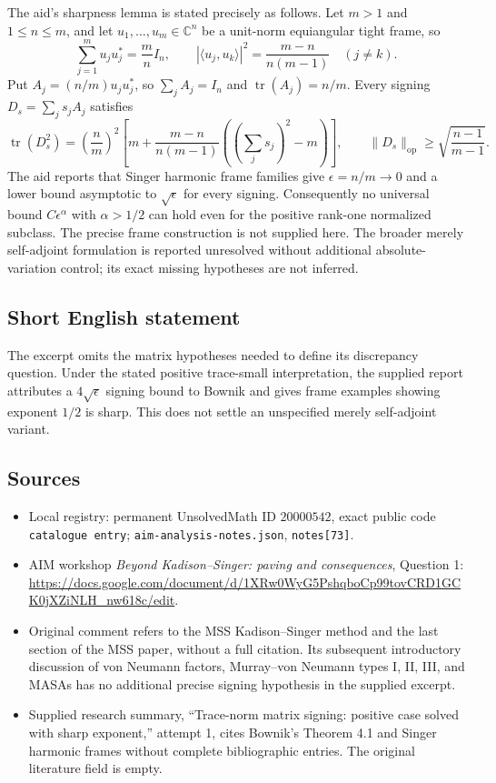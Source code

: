 \documentclass[11pt]{article}
\newcommand{\C}{\mathbb{C}}
\begin{document}
The aid's sharpness lemma is stated precisely as follows. Let \(m>1\) and \(1\leq n\leq m\), and let \(u_1,\ldots,u_m\in\C^n\) be a unit-norm equiangular tight frame, so
\[
 \sum_{j=1}^m u_ju_j^*=\frac mn I_n,\qquad
 |\langle u_j,u_k\rangle|^2=\frac{m-n}{n(m-1)}\quad(j\neq k).
\]
Put \(A_j=(n/m)u_ju_j^*\), so \(\sum_jA_j=I_n\) and \(\operatorname{tr}(A_j)=n/m\). Every signing \(D_s=\sum_js_jA_j\) satisfies
\[
 \operatorname{tr}(D_s^2)=\left(\frac nm\right)^2
 \left[m+\frac{m-n}{n(m-1)}\left(\left(\sum_js_j\right)^2-m\right)\right],\qquad
 \|D_s\|_{\mathrm{op}}\geq\sqrt{\frac{n-1}{m-1}}.
\]
The aid reports that Singer harmonic frame families give \(\epsilon=n/m\to0\) and a lower bound asymptotic to \(\sqrt\epsilon\) for every signing. Consequently no universal bound \(C\epsilon^\alpha\) with \(\alpha>1/2\) can hold even for the positive rank-one normalized subclass. The precise frame construction is not supplied here. The broader merely self-adjoint formulation is reported unresolved without additional absolute-variation control; its exact missing hypotheses are not inferred.
\subsection{Short English statement}
The excerpt omits the matrix hypotheses needed to define its discrepancy question. Under the stated positive trace-small interpretation, the supplied report attributes a \(4\sqrt\epsilon\) signing bound to Bownik and gives frame examples showing exponent \(1/2\) is sharp. This does not settle an unspecified merely self-adjoint variant.
\subsection{Sources}
\begin{itemize}
\item Local registry: permanent UnsolvedMath ID \(20000542\), exact public code \texttt{catalogue entry}; \texttt{aim-analysis-notes.json}, \texttt{notes[73]}.
\item AIM workshop \emph{Beyond Kadison--Singer: paving and consequences}, Question 1: \url{https://docs.google.com/document/d/1XRw0WyG5PshqboCp99tovCRD1GCK0jXZiNLH_nw618c/edit}.
\item Original comment refers to the MSS Kadison--Singer method and the last section of the MSS paper, without a full citation. Its subsequent introductory discussion of von Neumann factors, Murray--von Neumann types I, II, III, and MASAs has no additional precise signing hypothesis in the supplied excerpt.
\item Supplied research summary, ``Trace-norm matrix signing: positive case solved with sharp exponent,'' attempt 1, cites Bownik's Theorem 4.1 and Singer harmonic frames without complete bibliographic entries. The original literature field is empty.
\end{itemize}
\end{document}

